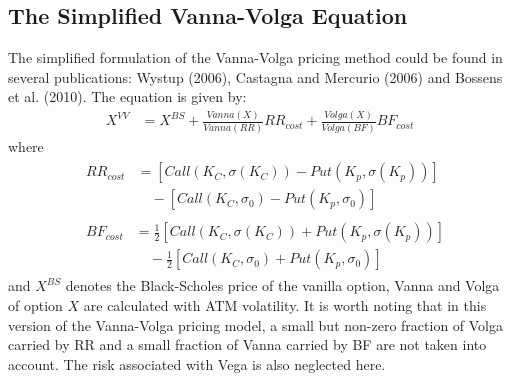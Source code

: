\subsection{The Simplified Vanna-Volga Equation}
The simplified formulation of the Vanna-Volga pricing method could be found in several publications: Wystup (2006), Castagna and Mercurio (2006) and Bossens et al. (2010).
The equation is given by:
\begin{align}
X^{VV} &= X^{BS} + \frac{Vanna(X)}{Vanna(RR)}RR_{cost}+ \frac{Volga(X)}{Volga(BF)}BF_{cost}
\end{align}
where
\begin{align}
&\begin{aligned}
RR_{cost} &= \left[Call\left( K_C,\sigma\left( K_C\right) \right) -Put\left( K_p,\sigma\left( K_p\right) \right)\right] \\
&\quad - \left[Call\left( K_C,\sigma_0 \right) -Put\left( K_p,\sigma_0 \right)\right]
\end{aligned} \\
&\begin{aligned}
BF_{cost} &= \frac{1}{2} \left[Call\left( K_C,\sigma\left( K_C\right) \right) +Put\left( K_p,\sigma\left( K_p\right) \right)\right] \\
&\quad - \frac{1}{2}\left[Call\left( K_C,\sigma_0 \right) + Put\left( K_p,\sigma_0 \right)\right]
\end{aligned}
\end{align}
and $X^{BS}$ denotes the Black-Scholes price of the vanilla option, Vanna and Volga of option $X$ are calculated with ATM volatility. \newline
\newline
It is worth noting that in this version of the Vanna-Volga pricing model, a small but non-zero fraction of Volga carried by RR and a small fraction of Vanna carried by BF are not taken into account. The risk associated with Vega is also neglected here.

